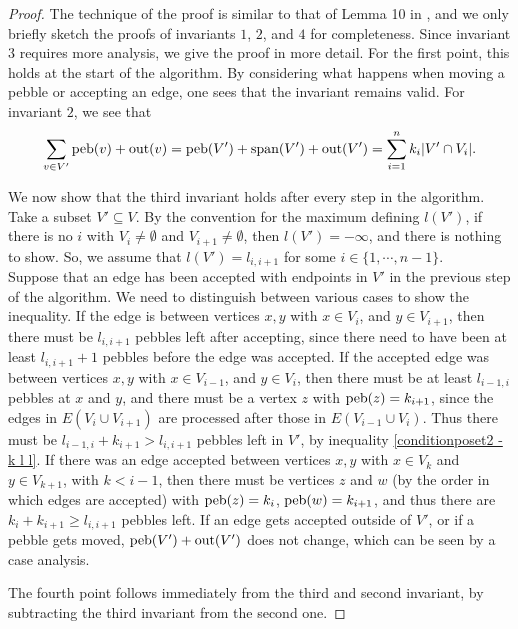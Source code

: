 \documentclass[10pt,a4paper]{article}
\newcommand{\out}{\textup{out}}
\newcommand{\spa}{\textup{span}}
\newcommand{\peb}{\textup{peb}}
\begin{document}
\begin{proof}
    The technique of the proof is similar to that of Lemma 10 in \cite{LEE20081425}, and we only briefly sketch the proofs of invariants $1$, $2$, and $4$ for completeness. Since invariant $3$ requires more analysis, we give the proof in more detail. 
    For the first point, this holds at the start of the algorithm. By considering what happens when moving a pebble or accepting an edge, one sees that the invariant remains valid. For invariant $2$, we see that $$\sum_{v\in V'} \peb(v) + \out(v) = \peb(V') + \spa(V') +\out(V') = \sum_{i=1}^{n} k_i \vert V' \cap V_i \vert.$$
    
     We now show that the third invariant holds after every step in the algorithm. Take a subset $V' \subseteq V$. By the convention for the maximum defining $l(V')$, if there is no $i$ with $V_{i}\neq \emptyset$ and $V_{i+1} \neq \emptyset$, then $l(V')=-\infty$, and there is nothing to show. So, we assume that $l(V')=l_{i, i+1}$ for some $i\in \{1,\cdots, n-1\}$.\\
    Suppose that an edge has been accepted with endpoints in $V'$ in the previous step of the algorithm. We need to distinguish between various cases to show the inequality. If the edge is between vertices $x,y$ with $x\in V_{i}$, and $y\in V_{i+1}$, then there must be $l_{i,i+1}$ pebbles left after accepting, since there need to have been at least $l_{i, i+1} +1$ pebbles before the edge was accepted. If the accepted edge was between vertices $x,y$ with $x\in V_{i-1}$, and $y\in V_i$, then there must be at least $l_{i-1,i}$ pebbles at $x$ and $y$, and there must be a vertex $z$ with $\peb(z) =k_{i+1}$, since the edges in $E(V_i\cup V_{i+1})$ are processed after those in $E(V_{i-1}\cup V_{i})$. Thus there must be $l_{i-1,i} + k_{i+1} > l_{i,i+1}$ pebbles left in $V'$, by inequality \eqref{conditionposet2 - k l l}. If there was an edge accepted between vertices $x,y$ with $x \in V_{k}$ and $y \in V_{k+1}$, with $k< i-1$, then there must be vertices $z$ and $w$ (by the order in which edges are accepted) with $\peb(z) =k_{i}$, $\peb(w) =k_{i+1}$, and thus there are $k_i + k_{i+1}\geq l_{i,i+1}$ pebbles left. If an edge gets accepted outside of $V'$, or if a pebble gets moved, $\peb(V') +\out(V')$ does not change, which can be seen by a case analysis.
    
    The fourth point follows immediately from the third and second invariant, by subtracting the third invariant from the second one.
\end{proof}
\end{document}
